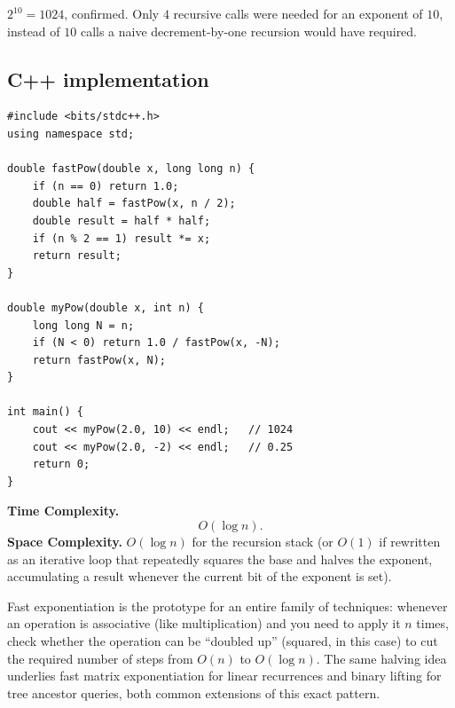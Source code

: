$2^{10}=1024$, confirmed. Only $4$ recursive calls were needed for an
exponent of $10$, instead of $10$ calls a naive decrement-by-one
recursion would have required.

\subsection*{C++ implementation}

\begin{lstlisting}
#include <bits/stdc++.h>
using namespace std;

double fastPow(double x, long long n) {
    if (n == 0) return 1.0;
    double half = fastPow(x, n / 2);
    double result = half * half;
    if (n % 2 == 1) result *= x;
    return result;
}

double myPow(double x, int n) {
    long long N = n;
    if (N < 0) return 1.0 / fastPow(x, -N);
    return fastPow(x, N);
}

int main() {
    cout << myPow(2.0, 10) << endl;   // 1024
    cout << myPow(2.0, -2) << endl;   // 0.25
    return 0;
}
\end{lstlisting}

\begin{complexitybox}
\textbf{Time Complexity.}
\[
  O(\log n).
\]
\textbf{Space Complexity.} $O(\log n)$ for the recursion stack (or
$O(1)$ if rewritten as an iterative loop that repeatedly squares the
base and halves the exponent, accumulating a result whenever the current
bit of the exponent is set).
\end{complexitybox}

\begin{takeawaybox}
Fast exponentiation is the prototype for an entire family of techniques:
whenever an operation is associative (like multiplication) and you need
to apply it $n$ times, check whether the operation can be ``doubled up''
(squared, in this case) to cut the required number of steps from $O(n)$
to $O(\log n)$. The same halving idea underlies fast matrix
exponentiation for linear recurrences and binary lifting for tree
ancestor queries, both common extensions of this exact pattern.
\end{takeawaybox}
